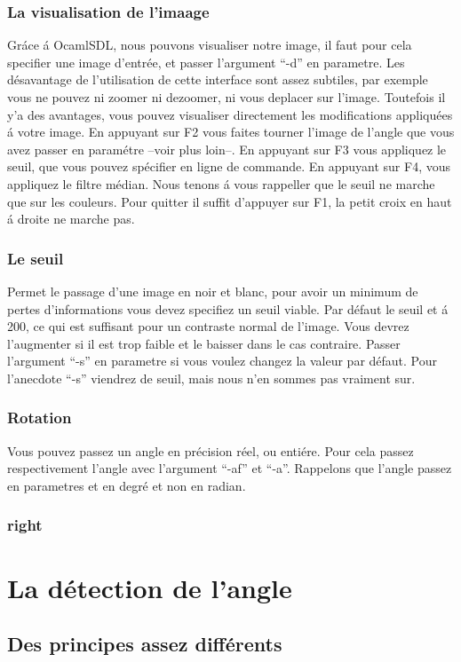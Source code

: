 \subsection{ La visualisation de l'imaage }
 Gr\'ace \'a OcamlSDL, nous pouvons visualiser notre image, il faut pour
 cela specifier une image d'entr\'ee, et passer l'argument ``-d'' en
 parametre. Les d\'esavantage de l'utilisation de cette interface sont
 assez subtiles, par exemple vous ne pouvez ni zoomer ni dezoomer, ni
 vous deplacer sur l'image. Toutefois il y'a des avantages, vous pouvez
 visualiser directement les modifications appliqu\'ees \'a votre
 image. En appuyant sur F2 vous faites tourner l'image de l'angle que
 vous avez passer en param\'etre --voir plus loin--. En appuyant sur F3
 vous appliquez le seuil, que vous pouvez sp\'ecifier en ligne de
 commande. En appuyant sur F4, vous appliquez le filtre m\'edian. Nous
 tenons \'a vous rappeller que le seuil ne marche que sur les couleurs.
 Pour quitter il suffit d'appuyer sur F1, la petit croix en haut \'a
 droite ne marche pas.
\subsection{ Le seuil }
 Permet le passage d'une image en noir et blanc, pour avoir un minimum
 de pertes d'informations vous devez specifiez un seuil viable. Par
 d\'efaut le seuil et \'a 200, ce qui est suffisant pour un contraste
 normal de l'image. Vous devrez l'augmenter si il est trop faible et le
 baisser dans le cas contraire. Passer l'argument ``-s'' en
 parametre si vous voulez changez la valeur par d\'efaut. Pour
 l'anecdote ``-s'' viendrez de seuil, mais nous n'en sommes pas vraiment
 sur.
\subsection{ Rotation }
 Vous pouvez passez un angle en pr\'ecision r\'eel, ou enti\'ere. Pour
 cela passez respectivement l'angle avec l'argument ``-af'' et ``-a''.
 Rappelons que l'angle passez en parametres et en degr\'e et non en
 radian.
\subsection{ right }
\chapter{ La d\'etection de l'angle }
\section{ Des principes assez diff\'erents}
